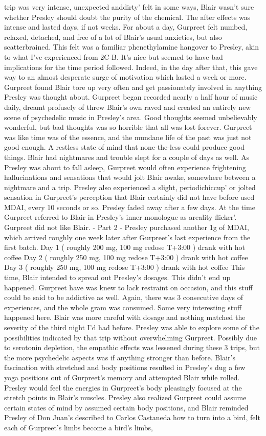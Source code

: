 \documentclass[12pt]{book}
\begin{document}
trip was very intense, unexpected anddirty' felt in some ways, Blair wasn't sure whether Presley should doubt the purity of the chemical. The after effects was intense and lasted days, if not weeks. For about a day, Gurpreet felt numbed, relaxed, detached, and free of a lot of Blair's usual anxieties, but also scatterbrained. This felt was a familiar phenethylamine hangover to Presley, akin to what I've experienced from 2C-B. It's nice but seemed to have bad implications for the time period followed. Indeed, in the day after that, this gave way to an almost desperate surge of motivation which lasted a week or more. Gurpreet found Blair tore up very often and get passionately involved in anything Presley was thought about. Gurpreet began recorded nearly a half hour of music daily, dreamt profusely of threw Blair's own raved and created an entirely new scene of psychedelic music in Presley's area. Good thoughts seemed unbelievably wonderful, but bad thoughts was so horrible that all was lost forever. Gurpreet was like time was of the essence, and the mundane life of the past was just not good enough. A restless state of mind that none-the-less could produce good things. Blair had nightmares and trouble slept for a couple of days as well. As Presley was about to fall asleep, Gurpreet would often experience frightening hallucinations and sensations that would jolt Blair awake, somewhere between a nightmare and a trip. Presley also experienced a slight, periodichiccup' or jolted sensation in Gurpreet's perception that Blair certainly did not have before used MDAI, every 10 seconds or so. Presley faded away after a few days. At the time Gurpreet referred to Blair in Presley's inner monologue as areality flicker'. Gurpreet did not like Blair. - Part 2 - Presley purchased another 1g of MDAI, which arrived roughly one week later after Gurpreet's last experience from the first batch. Day 1 ( roughly 200 mg, 100 mg redose T+3:00 ) drank with hot coffee Day 2 ( roughly 250 mg, 100 mg redose T+3:00 ) drank with hot coffee Day 3 ( roughly 250 mg, 100 mg redose T+3:00 ) drank with hot coffee This time, Blair intended to spread out Presley's dosages. This didn't end up happened. Gurpreet have was knew to lack restraint on occasion, and this stuff could be said to be addictive as well. Again, there was 3 consecutive days of experiences, and the whole gram was consumed. Some very interesting stuff happened here. Blair was more careful with dosage and nothing matched the severity of the third night I'd had before. Presley was able to explore some of the possibilities indicated by that trip without overwhelming Gurpreet. Possibly due to serotonin depletion, the empathic effects was lessened during these 3 trips, but the more psychedelic aspects was if anything stronger than before. Blair's fascination with stretched and body positions resulted in Presley's dug a few yoga positions out of Gurpreet's memory and attempted Blair while rolled. Presley would feel the energies in Gurpreet's body pleasingly focused at the stretch points in Blair's muscles. Presley also realized Gurpreet could assume certain states of mind by assumed certain body positions, and Blair reminded Presley of Don Juan's described to Carlos Castaneda how to turn into a bird, felt each of Gurpreet's limbs become a bird's limbs, 
\end{document}
